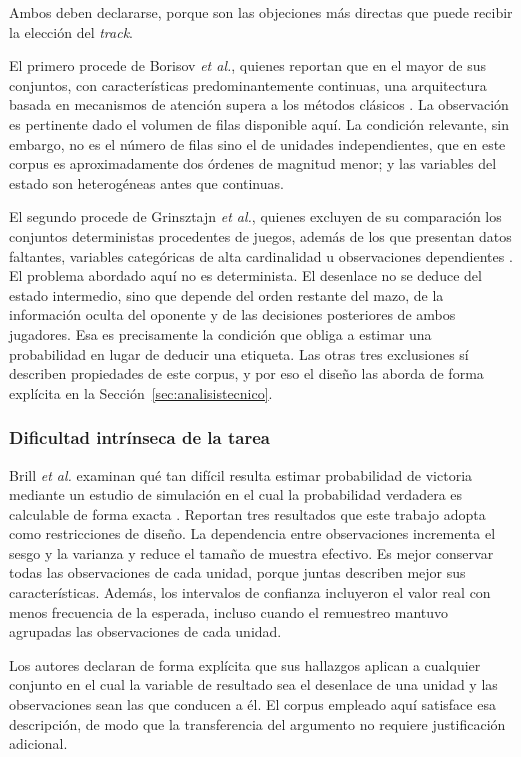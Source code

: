 Ambos deben declararse, porque son las objeciones más directas que puede
recibir la elección del \textit{track}.

El primero procede de Borisov \textit{et al.}, quienes reportan que en el
mayor de sus conjuntos, con características predominantemente continuas, una
arquitectura basada en mecanismos de atención supera a los métodos clásicos
\cite{borisov_tabular_2024}. La observación es pertinente dado el volumen de
filas disponible aquí. La condición relevante, sin embargo, no es el número
de filas sino el de unidades independientes, que en este corpus es
aproximadamente dos órdenes de magnitud menor; y las variables del estado
son heterogéneas antes que continuas.

El segundo procede de Grinsztajn \textit{et al.}, quienes excluyen de su
comparación los conjuntos deterministas procedentes de juegos, además de los
que presentan datos faltantes, variables categóricas de alta cardinalidad u
observaciones dependientes \cite{grinsztajn_trees_2022}. El problema
abordado aquí no es determinista. El desenlace no se deduce del estado
intermedio, sino que depende del orden restante del mazo, de la información
oculta del oponente y de las decisiones posteriores de ambos jugadores. Esa
es precisamente la condición que obliga a estimar una probabilidad en lugar
de deducir una etiqueta. Las otras tres exclusiones sí describen propiedades
de este corpus, y por eso el diseño las aborda de forma explícita en la
Sección~\ref{sec:analisistecnico}.

\subsubsection{Dificultad intrínseca de la tarea}

Brill \textit{et al.} examinan qué tan difícil resulta estimar probabilidad
de victoria mediante un estudio de simulación en el cual la probabilidad
verdadera es calculable de forma exacta \cite{brill_winprob_2026}. Reportan
tres resultados que este trabajo adopta como restricciones de diseño. La
dependencia entre observaciones incrementa el sesgo y la varianza y reduce
el tamaño de muestra efectivo. Es mejor conservar todas las observaciones
de cada unidad, porque juntas describen mejor sus características. Además,
los intervalos de confianza incluyeron el valor real con menos frecuencia
de la esperada, incluso cuando el remuestreo mantuvo agrupadas las
observaciones de cada unidad.

Los autores declaran de forma explícita que sus hallazgos aplican a
cualquier conjunto en el cual la variable de resultado sea el desenlace de
una unidad y las observaciones sean las que conducen a él. El corpus
empleado aquí satisface esa descripción, de modo que la transferencia del
argumento no requiere justificación adicional.

